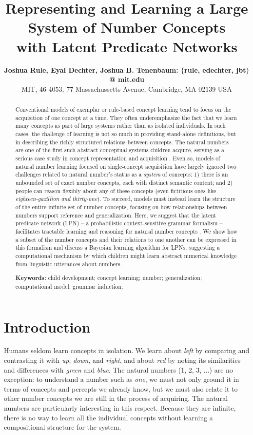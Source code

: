 \documentclass[10pt,letterpaper]{article}
\title{Representing and Learning a Large System of Number Concepts\\with Latent Predicate Networks}
\author{
  {\large \bf Joshua Rule, Eyal Dechter, Joshua B. Tenenbaum: $\{$rule, edechter, jbt$\}$ @ mit.edu}\\
  MIT, 46-4053, 77 Massachussetts Avenue, Cambridge, MA 02139 USA}
\begin{document}
\maketitle

\begin{abstract}
  Conventional models of exemplar or rule-based concept learning tend
  to focus on the acquisition of one concept at a time. They often
  underemphasize the fact that we learn many concepts as part of large
  systems rather than as isolated individuals. In such cases, the
  challenge of learning is not so much in providing stand-alone
  definitions, but in describing the richly structured relations
  between concepts. The natural numbers are one of the first such
  abstract conceptual systems children acquire, serving as a serious
  case study in concept representation and acquisition
  \citep{fuson1988children,galGel2005,Car2009}. Even so, models of
  natural number learning focused on single-concept acquisition have
  largely ignored two challenges related to natural number's status as
  a \emph{system} of concepts: 1) there is an unbounded set of exact
  number concepts, each with distinct semantic content; and 2) people
  can reason flexibly about any of these concepts (even fictitious
  ones like \emph{eighteen-gazillion and thirty-one}). To succeed,
  models must instead learn the structure of the entire infinite set
  of number concepts, focusing on how relationships between numbers
  support reference and generalization. Here, we suggest that the
  latent predicate network (LPN) -- a probabilistic context-sensitive
  grammar formalism -- facilitates tractable learning and reasoning
  for natural number concepts \citep{DecRulTen2015}. We show how a
  subset of the number concepts and their relations to one another can
  be expressed in this formalism and discuss a Bayesian learning
  algorithm for LPNs, suggesting a computational mechanism by which
  children might learn abstract numerical knowledge from linguistic
  utterances about numbers.

  \textbf{Keywords:}
  child development; concept learning; number; generalization;
  computational model; grammar induction;
\end{abstract}

\section{Introduction}

Humans seldom learn concepts in isolation. We learn about \emph{left}
by comparing and contrasting it with \emph{up}, \emph{down}, and
\emph{right}, and about \emph{red} by noting its similarities and
differences with \emph{green} and \emph{blue}. The natural numbers (1,
2, 3, $\ldots$) are no exception: to understand a number such as
\emph{one}, we must not only ground it in terms of concepts and
percepts we already know, but we must also relate it to other number
concepts we are still in the process of acquiring. The natural numbers
are particularly interesting in this respect. Because they are
infinite, there is no way to learn all the individual concepts without
learning a compositional structure for the system.
\end{document}
